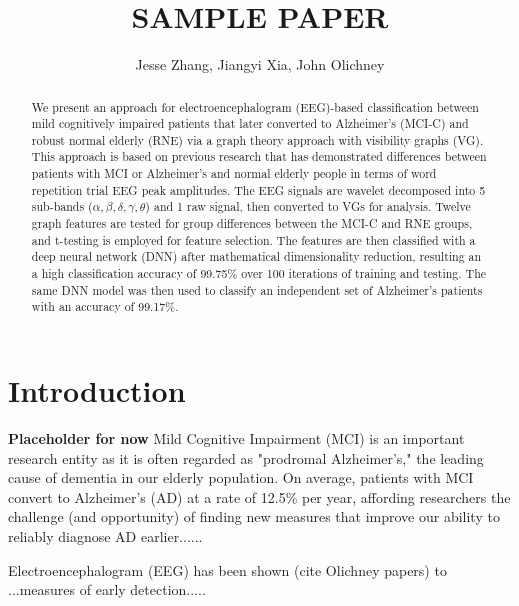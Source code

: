 \documentclass[Afour,times,sageh]{sagej}
\begin{document}

\title{SAMPLE PAPER}

\author{Jesse Zhang, Jiangyi Xia, John Olichney }


\corrauth{}


\begin{abstract}
We present an approach for electroencephalogram (EEG)-based classification between mild cognitively impaired patients that later converted to Alzheimer's (MCI-C) and robust normal elderly (RNE) via a graph theory approach with visibility graphs (VG). This approach is based on previous research that has demonstrated  differences between patients with MCI or Alzheimer's and normal elderly people in terms of word repetition trial EEG peak amplitudes. The EEG signals are wavelet decomposed into 5 sub-bands ($\alpha, \beta, \delta, \gamma, \theta$) and 1 raw signal, then converted to VGs for analysis. Twelve graph features are tested for group differences between the MCI-C and RNE groups, and t-testing is employed for feature selection. The features are then classified with a deep neural network (DNN) after mathematical dimensionality reduction, resulting an a high classification accuracy of 99.75\% over 100 iterations of training and testing. The same DNN model was then used to classify an independent set of Alzheimer's patients with an accuracy of 99.17\%.
\end{abstract}

\keywords{}

\maketitle
\section{Introduction}
\textbf{Placeholder for now}
Mild Cognitive Impairment (MCI) is an important research entity as it is often regarded as "prodromal Alzheimer's," the leading cause of dementia in our elderly population. On average, patients with MCI convert to Alzheimer's (AD) at a rate of 12.5\% per year, affording researchers the challenge (and opportunity) of finding new measures that improve our ability to reliably diagnose AD earlier......

Electroencephalogram (EEG) has been shown (cite Olichney papers) to ...measures of early detection.....
\end{document}
